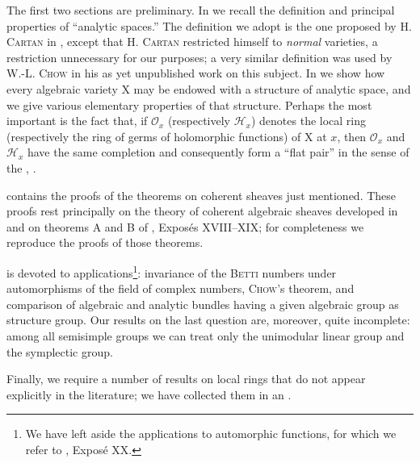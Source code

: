 The first two sections are preliminary. In  we recall the definition and principal properties of ``analytic spaces.'' The definition we adopt is the one proposed by H. \textsc{Cartan} in , except that H. \textsc{Cartan} restricted himself to \textit{normal} varieties, a restriction unnecessary for our purposes; a very similar definition was used by W.-L. \textsc{Chow} in his as yet unpublished work on this subject. In  we show how every algebraic variety $\mathrm{X}$ may be endowed with a structure of analytic space, and we give various elementary properties of that structure. Perhaps the most important is the fact that, if $\mathcal{O}_x$ (respectively $\mathcal{H}_x$) denotes the local ring (respectively the ring of germs of holomorphic functions) of $\mathrm{X}$ at $x$, then $\mathcal{O}_x$ and $\mathcal{H}_x$ have the same completion and consequently form a ``flat pair'' in the sense of the , .

 contains the proofs of the theorems on coherent sheaves just mentioned. These proofs rest principally on the theory of coherent algebraic sheaves developed in  and on theorems A and B of , Expos\'es XVIII--XIX; for completeness we reproduce the proofs of those theorems.

 is devoted to applications\footnote{We have left aside the applications to automorphic functions, for which we refer to , Expos\'e XX.}: invariance of the \textsc{Betti} numbers under automorphisms of the field of complex numbers, \textsc{Chow}'s theorem, and comparison of algebraic and analytic bundles having a given algebraic group as structure group. Our results on the last question are, moreover, quite incomplete: among all semisimple groups we can treat only the unimodular linear group and the symplectic group.

Finally, we require a number of results on local rings that do not appear explicitly in the literature; we have collected them in an .
